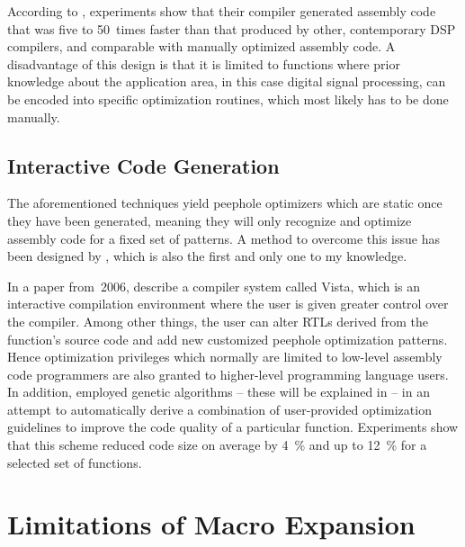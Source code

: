 According to \citeauthor{GeninEtAl:1989}, experiments show that their
\gls{compiler} generated \gls{assembly code} that was five to \num{50}~times
faster than that produced by other, contemporary \gls{DSP} \glspl{compiler}, and
comparable with manually optimized \gls{assembly code}.
%
A disadvantage of this design is that it is limited to \glspl{function} where
prior knowledge about the application area, in this case digital signal
processing, can be encoded into specific optimization routines, which most
likely has to be done manually.



\subsection{Interactive Code Generation}

The aforementioned techniques yield \glspl{peephole optimizer} which are static
once they have been generated, meaning they will only recognize and optimize
\gls{assembly code} for a fixed set of \glspl{pattern}.
%
A method to overcome this issue has been designed by
\textcite{KulkarniEtAl:2006}, which is also the first and only one to my
knowledge.

In a paper from~2006, \citeauthor{KulkarniEtAl:2006} describe a \gls{compiler}
system called \gls{Vista}, which is an interactive compilation environment where
the user is given greater control over the \gls{compiler}.
%
Among other things, the user can alter \glspl{RTL} derived from the
\gls{function}'s source code and add new customized \gls{peephole optimization}
\glspl{pattern}.
%
Hence optimization privileges which normally are limited to low-level
\gls{assembly code} programmers are also granted to higher-level programming
language users.
%
In addition, \citeauthor{KulkarniEtAl:2006} employed genetic algorithms -- these
will be explained in  -- in an attempt to
automatically derive a combination of user-provided optimization guidelines to
improve the code quality of a particular \gls{function}.
%
Experiments show that this scheme reduced code size on average by
\SI{4}{\percent} and up to \SI{12}{\percent} for a selected set of
\glspl{function}.


\section{Limitations of Macro Expansion}

